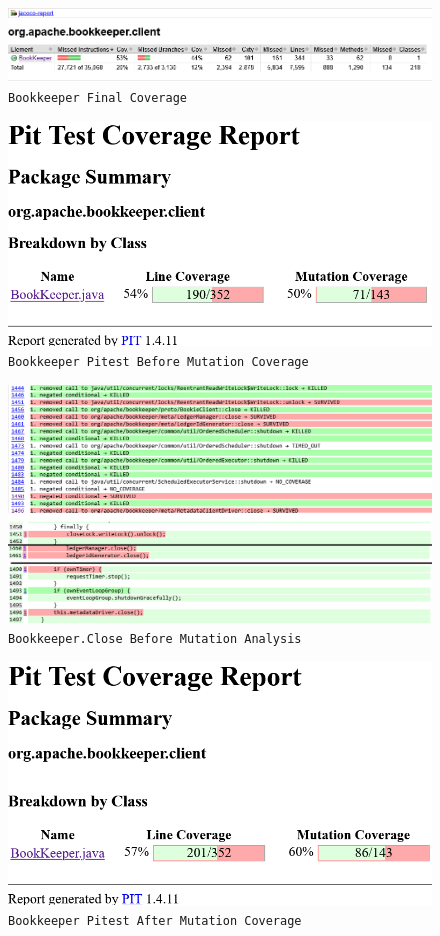 \documentclass[10pt]{article}
\begin{document}
{		\begin{figure}
			\centering
			\includegraphics[width=1.0\linewidth, frame]{img/Bookkeeper-last-coverage.png}
			\caption{\texttt{Bookkeeper Final Coverage}}
			\label{fig:BookkeeperLastCoverage}
		\end{figure}
		
		\begin{figure}
			\centering
			\includegraphics[width=0.5\linewidth, frame]{img/pitest-before-coverage-bk.png}
			\caption{\texttt{Bookkeeper Pitest Before Mutation Coverage}}
			\label{fig:PitestReportBeforeBK}
		\end{figure}
		
		\begin{figure}
			\centering
			\includegraphics[width=1.0\linewidth, frame]{img/Close-before-mutation-bk.png}
			\caption{\texttt{Bookkeeper.Close Before Mutation Analysis}}
			\label{fig:CloseBeforeMutationBK}
		\end{figure}
		
		\begin{figure}
			\centering
			\includegraphics[width=0.5\linewidth, frame]{img/pitest-after-coverage-bk.png}
			\caption{\texttt{Bookkeeper Pitest After Mutation Coverage}}
			\label{fig:PitestReportAfterBK}
		\end{figure}
		
}
\end{document}
